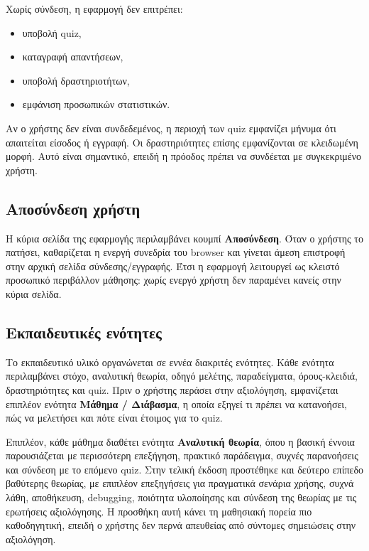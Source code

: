 \documentclass[a4paper]{article}
\begin{document}
Χωρίς σύνδεση, η εφαρμογή δεν επιτρέπει:

\begin{itemize}[leftmargin=1.2cm]
  \item υποβολή quiz,
  \item καταγραφή απαντήσεων,
  \item υποβολή δραστηριοτήτων,
  \item εμφάνιση προσωπικών στατιστικών.
\end{itemize}

Αν ο χρήστης δεν είναι συνδεδεμένος, η περιοχή των quiz εμφανίζει μήνυμα ότι απαιτείται είσοδος ή εγγραφή. Οι δραστηριότητες επίσης εμφανίζονται σε κλειδωμένη μορφή. Αυτό είναι σημαντικό, επειδή η πρόοδος πρέπει να συνδέεται με συγκεκριμένο χρήστη.

\subsection{Αποσύνδεση χρήστη}

Η κύρια σελίδα της εφαρμογής περιλαμβάνει κουμπί \textbf{Αποσύνδεση}. Όταν ο χρήστης το πατήσει, καθαρίζεται η ενεργή συνεδρία του browser και γίνεται άμεση επιστροφή στην αρχική σελίδα σύνδεσης/εγγραφής. Έτσι η εφαρμογή λειτουργεί ως κλειστό προσωπικό περιβάλλον μάθησης: χωρίς ενεργό χρήστη δεν παραμένει κανείς στην κύρια σελίδα.

\subsection{Εκπαιδευτικές ενότητες}

Το εκπαιδευτικό υλικό οργανώνεται σε εννέα διακριτές ενότητες. Κάθε ενότητα περιλαμβάνει στόχο, αναλυτική θεωρία, οδηγό μελέτης, παραδείγματα, όρους-κλειδιά, δραστηριότητες και quiz. Πριν ο χρήστης περάσει στην αξιολόγηση, εμφανίζεται επιπλέον ενότητα \textbf{Μάθημα / Διάβασμα}, η οποία εξηγεί τι πρέπει να κατανοήσει, πώς να μελετήσει και πότε είναι έτοιμος για το quiz.

Επιπλέον, κάθε μάθημα διαθέτει ενότητα \textbf{Αναλυτική θεωρία}, όπου η βασική έννοια παρουσιάζεται με περισσότερη επεξήγηση, πρακτικό παράδειγμα, συχνές παρανοήσεις και σύνδεση με το επόμενο quiz. Στην τελική έκδοση προστέθηκε και δεύτερο επίπεδο βαθύτερης θεωρίας, με επιπλέον επεξηγήσεις για πραγματικά σενάρια χρήσης, συχνά λάθη, αποθήκευση, debugging, ποιότητα υλοποίησης και σύνδεση της θεωρίας με τις ερωτήσεις αξιολόγησης. Η προσθήκη αυτή κάνει τη μαθησιακή πορεία πιο καθοδηγητική, επειδή ο χρήστης δεν περνά απευθείας από σύντομες σημειώσεις στην αξιολόγηση.
\end{document}
